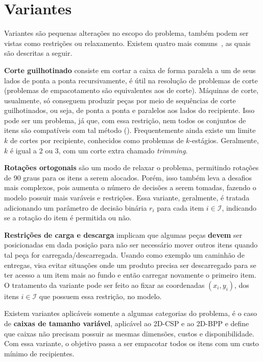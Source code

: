 \section{Variantes}\label{sec:variantes}


Variantes são pequenas alterações no escopo do problema, também podem ser vistas como restrições
ou relaxamento.
Existem quatro mais comuns~\cite{2DPackLib,exact-solution-techniques}, as quais são descritas a seguir.

\textbf{Corte guilhotinado} consiste em cortar a caixa de forma paralela a um de seus lados de ponta
a ponta recursivamente, é útil na resolução de problemas de corte (problemas de empacotamento
são equivalentes aos de corte).
Máquinas de corte, usualmente, só conseguem produzir peças por meio de sequências de corte
guilhotinados, ou seja, de ponta a ponta e paralelos aos lados do recipiente.
Isso pode ser um problema, já que, com essa restrição, nem todos os conjuntos de itens são
compatíveis com tal método ().
Frequentemente ainda existe um limite $k$ de cortes por recipiente, conhecidos como problemas de
$k$-estágios.
Geralmente, $k$ é igual a 2 ou 3, com um corte extra chamado \textit{trimming}.



\textbf{Rotações ortogonais} são um modo de relaxar o problema, permitindo rotações de 90 graus
para os itens a serem alocados.
Porém, isso também leva a desafios mais complexos, pois aumenta o número de decisões a serem tomadas,
fazendo o modelo possuir mais varáveis e restrições.
Essa variante, geralmente, é tratada adicionando um parâmetro de decisão binária $r_i$ para cada
item $i \in \mathcal{I}$, indicando se a rotação do item é permitida ou não.

\textbf{Restrições de carga e descarga} implicam que algumas peças \textbf{devem} ser posicionadas
em dada posição para não ser necessário mover outros itens quando tal peça for carregada/descarregada.
Usando como exemplo um caminhão de entregas, visa evitar situações onde um produto
precisa ser descarregado para se ter acesso a um item mais ao fundo e então carregar novamente o
primeiro item.
O tratamento da variante pode ser feito ao fixar as coordenadas $(x_i, y_i)$, dos itens
$i \in \mathcal{I}$ que possuem essa restrição, no modelo.

Existem variantes aplicáveis somente a algumas categorias do problema, é o caso de \textbf{caixas
de tamanho variável}, aplicável ao 2D-CSP e ao 2D-BPP e define que caixas
não precisam possuir as mesmas dimensões, custos e disponibilidade.
Com essa variante, o objetivo passa a ser empacotar todos os itens com um custo mínimo de recipientes.
